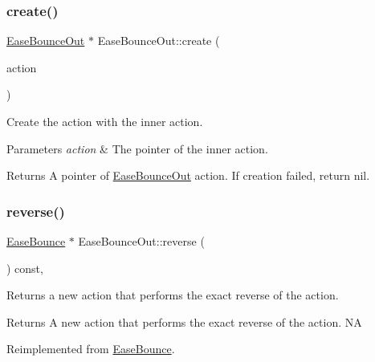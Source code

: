 \subsubsection{\texorpdfstring{create()}{create()}}
{\footnotesize\ttfamily \hyperlink{classEaseBounceOut}{Ease\+Bounce\+Out} $\ast$ Ease\+Bounce\+Out\+::create (\begin{DoxyParamCaption}\item[{\hyperlink{classActionInterval}{Action\+Interval} $\ast$}]{action }\end{DoxyParamCaption})\hspace{0.3cm}{\ttfamily [static]}}



Create the action with the inner action. 


\begin{DoxyParams}{Parameters}
{\em action} & The pointer of the inner action. \\
\hline
\end{DoxyParams}
\begin{DoxyReturn}{Returns}
A pointer of \hyperlink{classEaseBounceOut}{Ease\+Bounce\+Out} action. If creation failed, return nil. 
\end{DoxyReturn}
\mbox{\label{classEaseBounceOut_a03b87127deebcdf81cc7422690d0375e}} 
\subsubsection{\texorpdfstring{reverse()}{reverse()}}
{\footnotesize\ttfamily \hyperlink{classEaseBounce}{Ease\+Bounce} $\ast$ Ease\+Bounce\+Out\+::reverse (\begin{DoxyParamCaption}\item[{void}]{ }\end{DoxyParamCaption}) const\hspace{0.3cm}{\ttfamily [override]}, {\ttfamily [virtual]}}

Returns a new action that performs the exact reverse of the action.

\begin{DoxyReturn}{Returns}
A new action that performs the exact reverse of the action.  NA 
\end{DoxyReturn}


Reimplemented from \hyperlink{classEaseBounce_abbd0a4bae312fa781f226cad16222773}{Ease\+Bounce}.

